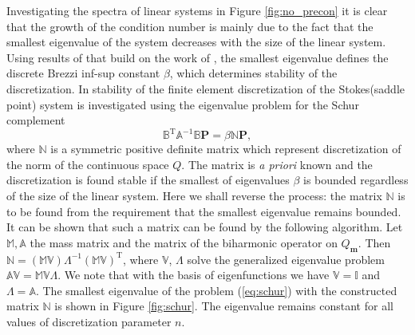 \documentclass{marine_2015}
\newcommand{\Amat}{\ensuremath{\mathbb{A}}}
\newcommand{\Bmat}{\ensuremath{\mathbb{B}}}
\newcommand{\Pvec}{\ensuremath{\mathbf{P}}}
\newcommand{\Qh}{\ensuremath{Q_{\mathbf{m}}}}
\begin{document}
Investigating the spectra of linear systems in Figure \ref{fig:no_precon} it is
clear that the growth of the condition number is mainly due to the fact that the
smallest eigenvalue of the system decreases with the size of the linear system.
Using results of \cite{marie} that build on the work of \cite{malkus}, the
smallest eigenvalue defines the discrete Brezzi inf-sup constant $\beta$, which
determines stability of the discretization. In \cite{marie} stability of the
finite element discretization of the Stokes(saddle point) system is investigated using
the eigenvalue problem for the Schur complement
\begin{equation}
  \label{eq:schur}
  \Bmat^{\text{T}}\Amat^{-1}\Bmat\Pvec = \beta\mathbb{N}\Pvec,
\end{equation}
where $\mathbb{N}$ is a symmetric positive definite matrix which
represent discretization of the norm of the continuous space $Q$. The matrix is
\textit{a priori} known and the discretization is found stable if the smallest 
of eigenvalues $\beta$ is bounded regardless of the size of the linear system. Here
we shall reverse the process: the matrix $\mathbb{N}$ is to be found from the
requirement that the smallest eigenvalue remains bounded. It can be shown that
such a matrix can be found by the following algorithm. Let $\mathbb{M},
\mathbb{A}$ the mass matrix and the matrix of the biharmonic operator on $\Qh$.
Then
$\mathbb{N}=\left(\mathbb{M}\mathbb{V}\right){\Lambda}^{-1}\left(\mathbb{M}\mathbb{V}\right)^{\text{T}}$,
where $\mathbb{V}$, $\Lambda$  solve the generalized eigenvalue problem
$\mathbb{A}\mathbb{V}=\mathbb{M}\mathbb{V}\Lambda$. We note that with the basis
of eigenfunctions we have $\mathbb{V}=\mathbb{I}$ and $\Lambda=\mathbb{A}$. The
smallest eigenvalue of the problem (\ref{eq:schur}) with the constructed matrix
$\mathbb{N}$ is shown in Figure \ref{fig:schur}. The eigenvalue remains constant
for all values of discretization parameter $n$.
 
\end{document}
